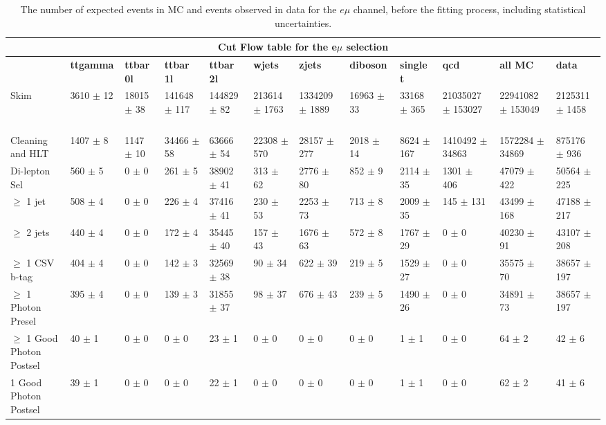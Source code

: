 \begin{table}
  \centering
\resizebox{\columnwidth}{!} {

\begin{tabular}{|l|l|l|l|l|l|l|l|l|l|l|l|}
\hline
\multicolumn{12}{|c|}{\textbf{Cut Flow table for the e$\mu$ selection}} \\
\hline
& \textbf{ttgamma} & \textbf{ttbar 0l} & \textbf{ttbar 1l} & \textbf{ttbar 2l} & \textbf{wjets} & \textbf{zjets} & \textbf{diboson} & \textbf{single t} & \textbf{qcd} & \textbf{all MC} & \textbf{data} \\
\hline
Skim & 3610 $\pm$ 12 \ & 18015 $\pm$ 38 \ & 141648 $\pm$ 117 \ & 144829 $\pm$ 82 \ & 213614 $\pm$ 1763 \ & 1334209 $\pm$ 1889 \ & 16963 $\pm$ 33 \ & 33168 $\pm$ 365 \ & 21035027 $\pm$ 153027 \ & 22941082 $\pm$ 153049\ & 2125311 $\pm$ 1458 \\
Cleaning and HLT & 1407 $\pm$ 8 \ & 1147 $\pm$ 10 \ & 34466 $\pm$ 58 \ & 63666 $\pm$ 54 \ & 22308 $\pm$ 570 \ & 28157 $\pm$ 277 \ & 2018 $\pm$ 14 \ & 8624 $\pm$ 167 \ & 1410492 $\pm$ 34863 \ & 1572284 $\pm$ 34869\ & 875176 $\pm$ 936 \\
Di-lepton Sel & 560 $\pm$ 5 \ & 0 $\pm$ 0 \ & 261 $\pm$ 5 \ & 38902 $\pm$ 41 \ & 313 $\pm$ 62 \ & 2776 $\pm$ 80 \ & 852 $\pm$ 9 \ & 2114 $\pm$ 35 \ & 1301 $\pm$ 406 \ & 47079 $\pm$ 422\ & 50564 $\pm$ 225 \\
$\geq$ 1 jet & 508 $\pm$ 4 \ & 0 $\pm$ 0 \ & 226 $\pm$ 4 \ & 37416 $\pm$ 41 \ & 230 $\pm$ 53 \ & 2253 $\pm$ 73 \ & 713 $\pm$ 8 \ & 2009 $\pm$ 35 \ & 145 $\pm$ 131 \ & 43499 $\pm$ 168\ & 47188 $\pm$ 217 \\
$\geq$ 2 jets & 440 $\pm$ 4 \ & 0 $\pm$ 0 \ & 172 $\pm$ 4 \ & 35445 $\pm$ 40 \ & 157 $\pm$ 43 \ & 1676 $\pm$ 63 \ & 572 $\pm$ 8 \ & 1767 $\pm$ 29 \ & 0 $\pm$ 0 \ & 40230 $\pm$ 91\ & 43107 $\pm$ 208 \\
$\geq$ 1 CSV b-tag & 404 $\pm$ 4 \ & 0 $\pm$ 0 \ & 142 $\pm$ 3 \ & 32569 $\pm$ 38 \ & 90 $\pm$ 34 \ & 622 $\pm$ 39 \ & 219 $\pm$ 5 \ & 1529 $\pm$ 27 \ & 0 $\pm$ 0 \ & 35575 $\pm$ 70\ & 38657 $\pm$ 197 \\
$\geq$ 1 Photon Presel & 395 $\pm$ 4 \ & 0 $\pm$ 0 \ & 139 $\pm$ 3 \ & 31855 $\pm$ 37 \ & 98 $\pm$ 37 \ & 676 $\pm$ 43 \ & 239 $\pm$ 5 \ & 1490 $\pm$ 26 \ & 0 $\pm$ 0 \ & 34891 $\pm$ 73\ & 38657 $\pm$ 197 \\
$\geq$ 1 Good Photon Postsel & 40 $\pm$ 1 \ & 0 $\pm$ 0 \ & 0 $\pm$ 0 \ & 23 $\pm$ 1 \ & 0 $\pm$ 0 \ & 0 $\pm$ 0 \ & 0 $\pm$ 0 \ & 1 $\pm$ 1 \ & 0 $\pm$ 0 \ & 64 $\pm$ 2\ & 42 $\pm$ 6 \\
1 Good Photon Postsel & 39 $\pm$ 1 \ & 0 $\pm$ 0 \ & 0 $\pm$ 0 \ & 22 $\pm$ 1 \ & 0 $\pm$ 0 \ & 0 $\pm$ 0 \ & 0 $\pm$ 0 \ & 1 $\pm$ 1 \ & 0 $\pm$ 0 \ & 62 $\pm$ 2\ & 41 $\pm$ 6 \\

\hline
\end{tabular}
}
\caption{The number of expected events in MC and events observed in data for the $e\mu$ channel, before the fitting process, including statistical uncertainties.}
\end{table}

